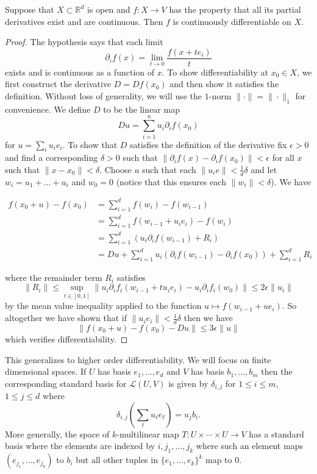 \documentclass[twoside, a4paper, 10pt]{amsart}
\begin{document}
\begin{prop} Suppose that $X \subset \mathbb{R}^d$ is open and $f:X \to V$ has the property that all its partial derivatives exist and are continuous. Then $f$ is continuously differentiable on $X$.

\end{prop}

\begin{proof} The hypothesis says that each limit $$\partial_if(x) = \lim_{t \to 0} \frac{f(x+te_i)}{t}$$ exists and is continuous as a function of $x$. To show differentiability at $x_0 \in X$, we first construct the derivative $D= Df (x_0) $ and then show it satisfies the definition. Without loss of generality, we will use the $1$-norm $\| \cdot \| = \| \cdot \|_1$ for convenience. We define $D$ to be the linear map $$Du = \sum_{i=1}^n u_i \partial_i f (x_0)$$ for $u = \sum_i u_i e_i$. To show that $D$ satisfies the definition of the derivative fix $\epsilon >0$ and find a corresponding $\delta >0$ such that $\| \partial_i f(x) - \partial_if (x_0) \| < \epsilon$ for all $x$ such that $\|x - x_0\| < \delta$. Choose $u$ such that each $\|u_ie\| < \frac{1}{d} \delta$ and let $w_i = u_1 + \ldots + u_i$ and $w_0 = 0$ (notice that this ensures each $\|w_i \| < \delta$). We have 

\begin{align*} f(x_0 + u) - f(x_0) &= \sum_{i=1}^d f(w_i) - f(w_{i-1}) \\ &= \sum_{i=1}^d f(w_{i-1} + u_i e_i) - f(w_{i}) \\ &= \sum_{i=1}^d (u_i \partial_i f(w_{i-1}) + R_i) \\ &= Du + \sum_{i=1}^d u_i \left(\partial_i f(w_{i-1}) - \partial_i f(x_0) \right) + \sum_{i=1}^d R_i \end{align*}

where the remainder term $R_i$ satisfies $$\|R_i \| \leq \sup_{t \in [0,1]} \| u_i \partial_i f_i (w_{i-1} + tu_ie_i) - u_i \partial_i f_i (w_0)\| \leq 2 \epsilon \|u_i\|$$ by the mean value inequality applied to the function $u \mapsto f(w_{i-1} + ue_i)$. So altogether we have shown that if $\|u_i e_i\| < \frac{1}{d}\delta$ then we have $$\|f(x_0 + u) -f(x_0) - Du\| \leq 3\epsilon \|u\|$$ which verifies differentiability. \end{proof}

This generalizes to higher order differentiability. We will focus on finite dimensional spaces. If $U$ has basis $e_1, \ldots, e_d$ and $V$ has basis $b_1, \ldots, b_m$ then the corresponding standard basis for $\mathcal{L}(U,V)$ is given by $\delta_{i,j}$ for $1 \leq i \leq m$, $1 \leq j \leq d$ where $$\delta_{i,j}\left( \sum_{\ell} u_{\ell} e_{\ell} \right) = u_j b_i.$$ More generally, the space of $k$-multilinear map $T:U \times \cdots \times U \to V$ has a standard basis where the elements are indexed by $i, j_1, \ldots, j_k$ where such an element maps  $(e_{j_1}, \ldots, e_{j_k})$ to $b_i$ but all other tuples in $\{e_1, \ldots, e_k\}^k$ map to $0$.
\end{document}
